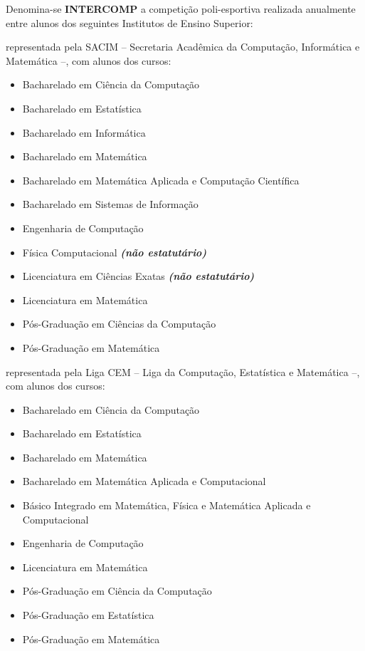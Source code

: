 \begin{article}
	\label{art:integrantes}
	Denomina-se \textbf{INTERCOMP} a competição poli-esportiva realizada anualmente entre alunos dos seguintes Institutos de Ensino Superior:
	\begin{description}[noitemsep]
		\item[USP - São Carlos] representada pela SACIM -- Secretaria Acadêmica da Computação, Informática e Matemática --, com alunos dos cursos:
		\begin{itemize}[noitemsep]
			\item Bacharelado em Ciência da Computação
			\item Bacharelado em Estatística
			\item Bacharelado em Informática
			\item Bacharelado em Matemática
			\item Bacharelado em Matemática Aplicada e Computação Científica
			\item Bacharelado em Sistemas de Informação
			\item Engenharia de Computação
			\item Física Computacional \textbf{\textit{(não estatutário)}}
			\item Licenciatura em Ciências Exatas \textbf{\textit{(não estatutário)}}
			\item Licenciatura em Matemática
			\item Pós-Graduação em Ciências da Computação
			\item Pós-Graduação em Matemática
		\end{itemize}

		\item[UNICAMP - Campinas] representada pela Liga CEM -- Liga da Computação, Estatística e Matemática --, com alunos dos cursos:
		\begin{itemize}[noitemsep]
			\item Bacharelado em Ciência da Computação
			\item Bacharelado em Estatística
			\item Bacharelado em Matemática
			\item Bacharelado em Matemática Aplicada e Computacional
			\item Básico Integrado em Matemática, Física e Matemática Aplicada e Computacional
			\item Engenharia de Computação
			\item Licenciatura em Matemática
			\item Pós-Graduação em Ciência da Computação
			\item Pós-Graduação em Estatística
			\item Pós-Graduação em Matemática
		\end{itemize}


\end{description}
\end{article}
